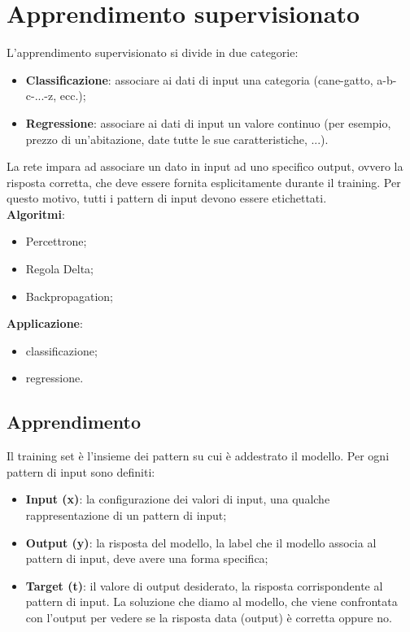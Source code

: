 \section{Apprendimento supervisionato}

L'apprendimento supervisionato si divide in due categorie:
\begin{itemize}
	\item \textbf{Classificazione}: associare ai dati di input una categoria
	(cane-gatto, a-b-c-...-z, ecc.);
	\item \textbf{Regressione}: associare ai dati di input un valore continuo
	(per esempio, prezzo di un'abitazione, date tutte le sue caratteristiche,
	...).
\end{itemize}

La rete impara ad associare un dato in input ad uno specifico output, ovvero la
risposta corretta, che deve essere fornita esplicitamente durante il training.
Per questo motivo, tutti i pattern di input devono essere etichettati.\\
\textbf{Algoritmi}:
\begin{itemize}
	\item Percettrone;
	\item Regola Delta;
	\item Backpropagation;
\end{itemize}

\textbf{Applicazione}:
\begin{itemize}
	\item classificazione;
	\item regressione.
\end{itemize}

\subsection{Apprendimento}
Il training set è l'insieme dei pattern su cui è
addestrato il modello. Per ogni pattern di input sono definiti:
\begin{itemize}
	\item \textbf{Input (x)}: la configurazione dei valori di input, una qualche
	rappresentazione di un pattern di input;

	\item \textbf{Output (y)}: la risposta del modello, la label che il modello 
		associa al pattern di input, deve avere una forma specifica;

	\item \textbf{Target (t)}: il valore di output desiderato, la risposta
	corrispondente al pattern di input. La soluzione che diamo al modello, che
	viene confrontata con l'output per vedere se la risposta data (output) è
	corretta oppure no.
\end{itemize}


